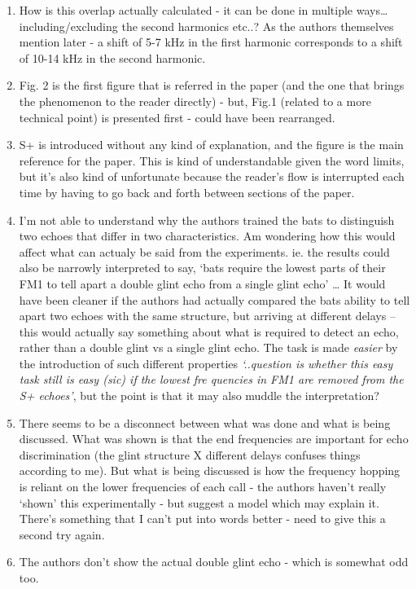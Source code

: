 \documentclass[
]{book}
\providecommand{\tightlist}{%
  \setlength{\itemsep}{0pt}\setlength{\parskip}{0pt}}
\begin{document}
\begin{enumerate}
\def\labelenumi{\arabic{enumi}.}
\tightlist
\item
  How is this overlap actually calculated - it can be done in multiple ways\ldots including/excluding the second harmonics etc..? As the authors themselves mention later - a shift of 5-7 kHz in the first harmonic corresponds to a shift of 10-14 kHz in the second harmonic.
\item
  Fig. 2 is the first figure that is referred in the paper (and the one that brings the phenomenon to the reader directly) - but, Fig.1 (related to a more technical point) is presented first - could have been rearranged.
\item
  S+ is introduced without any kind of explanation, and the figure is the main reference for the paper. This is kind of understandable given the word limits, but it's also kind of unfortunate because the reader's flow is interrupted each time by having to go back and forth between sections of the paper.
\item
  I'm not able to understand why the authors trained the bats to distinguish two echoes that differ in two characteristics. Am wondering how this would affect what can actualy be said from the experiments. ie. the results could also be narrowly interpreted to say, `bats require the lowest parts of their FM1 to tell apart a double glint echo from a single glint echo' \ldots{} It would have been cleaner if the authors had actually compared the bats ability to tell apart two echoes with the same structure, but arriving at different delays -- this would actually say something about what is required to detect an echo, rather than a double glint vs a single glint echo. The task is made \emph{easier} by the introduction of such different properties \emph{`..question is whether this easy task still is easy (sic) if the lowest fre quencies in FM1 are removed from the S+ echoes'}, but the point is that it may also muddle the interpretation?
\item
  There seems to be a disconnect between what was done and what is being discussed. What was shown is that the end frequencies are important for echo discrimination (the glint structure X different delays confuses things according to me). But what is being discussed is how the frequency hopping is reliant on the lower frequencies of each call - the authors haven't really `shown' this experimentally - but suggest a model which may explain it. There's something that I can't put into words better - need to give this a second try again.
\item
  The authors don't show the actual double glint echo - which is somewhat odd too.
\end{enumerate}
\end{document}
